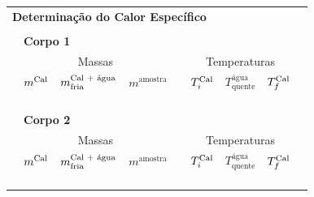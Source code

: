 \begin{table}[!ht]
\centering
\forcerectofloat
	\begin{tabular}{lp{22mm}p{22mm}p{22mm}lp{22mm}p{22mm}p{22mm}l}
		\toprule
\multicolumn{6}{l}{\textbf{Determinação do Calor Específico}}\\
\\
		&\multicolumn{6}{l}{\textbf{Corpo 1}}\\
		\cmidrule{2-8}
		&\multicolumn{3}{c}{Massas} & & \multicolumn{3}{c}{Temperaturas}& \\
		\cmidrule{2-4}\cmidrule{6-8}
		& $m^{\rm{Cal}}$ & $m^{\textrm{Cal + água}}_{\rm{fria}}$ & $m^{\textrm{amostra}}$ & & $T^{\rm{Cal}}_{i}$ & $T^{\textrm{água}}_{\textrm{quente}}$ & $T^{\rm{Cal}}_{f}$ & \\
		\cmidrule{2-4}\cmidrule{6-8}
		& \cellcolor[gray]{0.95} & \cellcolor[gray]{0.97} & \cellcolor[gray]{0.95} & & \cellcolor[gray]{0.95} & \cellcolor[gray]{0.97} & \cellcolor[gray]{0.95} & \\
		& \cellcolor[gray]{0.89} & \cellcolor[gray]{0.92} & \cellcolor[gray]{0.89} & & \cellcolor[gray]{0.89} & \cellcolor[gray]{0.92} & \cellcolor[gray]{0.89} & \\
		& \cellcolor[gray]{0.95} & \cellcolor[gray]{0.97} & \cellcolor[gray]{0.95} & & \cellcolor[gray]{0.95} & \cellcolor[gray]{0.97} & \cellcolor[gray]{0.95} & \\
		\cmidrule{2-8}
\\
		&\multicolumn{6}{l}{\textbf{Corpo 2}}\\
		\cmidrule{2-8}
		&\multicolumn{3}{c}{Massas} & & \multicolumn{3}{c}{Temperaturas}& \\
		\cmidrule{2-4}\cmidrule{6-8}
		& $m^{\rm{Cal}}$ & $m^{\textrm{Cal + água}}_{\rm{fria}}$ & $m^{\textrm{amostra}}$ & & $T^{\rm{Cal}}_{i}$ & $T^{\textrm{água}}_{\textrm{quente}}$ & $T^{\rm{Cal}}_{f}$ & \\
		\cmidrule{2-4}\cmidrule{6-8}
		& \cellcolor[gray]{0.95} & \cellcolor[gray]{0.97} & \cellcolor[gray]{0.95} & & \cellcolor[gray]{0.95} & \cellcolor[gray]{0.97} & \cellcolor[gray]{0.95} & \\
		& \cellcolor[gray]{0.89} & \cellcolor[gray]{0.92} & \cellcolor[gray]{0.89} & & \cellcolor[gray]{0.89} & \cellcolor[gray]{0.92} & \cellcolor[gray]{0.89} & \\
		& \cellcolor[gray]{0.95} & \cellcolor[gray]{0.97} & \cellcolor[gray]{0.95} & & \cellcolor[gray]{0.95} & \cellcolor[gray]{0.97} & \cellcolor[gray]{0.95} & \\
		\cmidrule{2-8}
\\

\end{tabular}
\end{table}
